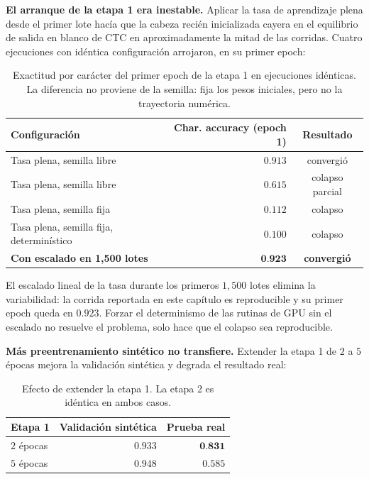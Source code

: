 \textbf{El arranque de la etapa 1 era inestable.} Aplicar la tasa de aprendizaje
plena desde el primer lote hacía que la cabeza recién inicializada cayera en el
equilibrio de salida en blanco de CTC en aproximadamente la mitad de las corridas.
Cuatro ejecuciones con idéntica configuración arrojaron, en su primer epoch:

\begin{table}[H]
    \centering
    \caption{Exactitud por carácter del primer epoch de la etapa 1 en ejecuciones
    idénticas. La diferencia no proviene de la semilla: fija los pesos iniciales,
    pero no la trayectoria numérica.}
    \begin{tabular}{lrc}
        \toprule
        \textbf{Configuración} & \textbf{Char. accuracy (epoch 1)} & \textbf{Resultado} \\
        \midrule
        Tasa plena, semilla libre                 & $0{.}913$ & convergió \\
        Tasa plena, semilla libre                 & $0{.}615$ & colapso parcial \\
        Tasa plena, semilla fija                  & $0{.}112$ & colapso \\
        Tasa plena, semilla fija, determinístico  & $0{.}100$ & colapso \\
        \midrule
        \textbf{Con escalado en 1,500 lotes}      & $\mathbf{0{.}923}$ & \textbf{convergió} \\
        \bottomrule
    \end{tabular}
\end{table}

El escalado lineal de la tasa durante los primeros $1{,}500$ lotes elimina la
variabilidad: la corrida reportada en este capítulo es reproducible y su primer
epoch queda en $0{.}923$. Forzar el determinismo de las rutinas de GPU sin el
escalado no resuelve el problema, solo hace que el colapso sea reproducible.

\textbf{Más preentrenamiento sintético no transfiere.} Extender la etapa 1 de $2$ a
$5$ épocas mejora la validación sintética y degrada el resultado real:

\begin{table}[H]
    \centering
    \caption{Efecto de extender la etapa 1. La etapa 2 es idéntica en ambos casos.}
    \begin{tabular}{lrr}
        \toprule
        \textbf{Etapa 1} & \textbf{Validación sintética} & \textbf{Prueba real} \\
        \midrule
        $2$ épocas & $0{.}933$ & $\mathbf{0{.}831}$ \\
        $5$ épocas & $0{.}948$ & $0{.}585$ \\
        \bottomrule
    \end{tabular}
\end{table}

